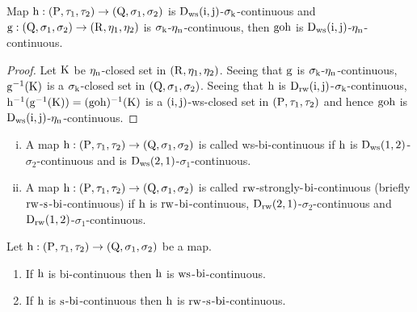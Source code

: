 \begin{thm}\label{thm8.5.12}
Map $\mathrm{h}:(\mathrm{P}, \tau_1, \tau_2 )\to (\mathrm{Q}, \sigma_{1}, \sigma_{2} )$ is $\mathrm{D}_{\mathrm{ws}} (\mathrm{i}, \mathrm{j})$-$\sigma_{\mathrm{k}}$-continuous and $\mathrm{g}: (\mathrm{Q}, \sigma_{1}, \sigma_{2} )\to (\mathrm{R}, \eta_{1}, \eta_{2})$ is $\sigma_{\mathrm{k}}$-$\eta_{\mathrm{n}}$-continuous, then $\mathrm{goh}$ is $\mathrm{D}_{\mathrm{ws}} (\mathrm{i}, \mathrm{j})$-$\eta_{\mathrm{n}}$-continuous.
\end{thm}

\newpage

\begin{proof}
Let $\mathrm{K}$ be $\eta_{\mathrm{n}}$-closed set in $(\mathrm{R}, \eta_{1}, \eta_{2} )$. Seeing that $\mathrm{g}$ is $\sigma_{\mathrm{k}}$-$\eta_{\mathrm{n}}$-continuous, $\mathrm{g}^{-1}(\mathrm{K})$ is a $\sigma_{\mathrm{k}}$-closed set in $(\mathrm{Q}, \sigma_{1}, \sigma_{2} )$. Seeing that $\mathrm{h}$ is $\mathrm{D}_{\mathrm{rw}}(\mathrm{i}, \mathrm{j})$-$\sigma_{\mathrm{k}}$-continuous, $\mathrm{h}^{-1} (\mathrm{g}^{-1}(\mathrm{K}))= (\mathrm{goh})^{-1} (\mathrm{K})$ is a $(\mathrm{i},\mathrm{j})$-ws-closed set in $(\mathrm{P}, \tau_1, \tau_2 )$ and hence $\mathrm{goh}$ is $\mathrm{D}_{\mathrm{ws}} (\mathrm{i}, \mathrm{j})$-$\eta_{\mathrm{n}}$-continuous.
\end{proof}

\begin{dfn}\label{defi8.5.2}
\begin{enumerate}[(i)]
\item A map $\mathrm{h}:(\mathrm{P}, \tau_1, \tau_2 )\to (\mathrm{Q}, \sigma_{1}, \sigma_{2} )$ is called ws-bi-continuous if $\mathrm{h}$ is $\mathrm{D}_{\mathrm{ws}} (1,2)$-$\sigma_{2}$-continuous and is $\mathrm{D}_{\mathrm{ws}} (2, 1)$-$\sigma_{1}$-continuous.

\item A map $\mathrm{h}:(\mathrm{P}, \tau_1, \tau_2 )\to (\mathrm{Q}, \sigma_{1}, \sigma_{2} )$ is called $\mathrm{rw}$-strongly-$\mathrm{bi}$-continuous (briefly $\mathrm{rw}$-$\mathrm{s}$-$\mathrm{bi}$-continuous) if $\mathrm{h}$ is $\mathrm{rw}$-$\mathrm{bi}$-continuous, $\mathrm{D}_{\mathrm{rw}} (2, 1)$-$\sigma_{2}$-continuous and\break $\mathrm{D}_{\mathrm{rw}}(1, 2)$-$\sigma_{1}$-continuous.
\end{enumerate}
\end{dfn}

\begin{thm}\label{thm8.5.13}
Let $\mathrm{h}: (\mathrm{P}, \tau_1, \tau_2 )\to (\mathrm{Q}, \sigma_{1}, \sigma_{2} )$ be a map.
\begin{enumerate}[(1)]
\item If $\mathrm{h}$ is bi-continuous then $\mathrm{h}$ is $\mathrm{ws}$-$\mathrm{bi}$-continuous.
\item If $\mathrm{h}$ is $\mathrm{s}$-$\mathrm{bi}$-continuous then $\mathrm{h}$ is $\mathrm{rw}$-$\mathrm{s}$-$\mathrm{bi}$-continuous.
\end{enumerate}
\end{thm}


